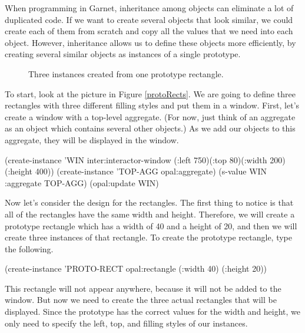 When programming in Garnet, inheritance among objects can eliminate a
lot of duplicated code.  If we want to create several objects that
look similar, we could create each of them from scratch and copy all
the values that we need into each object.  However, inheritance allows
us to define these objects more efficiently, by creating several
similar objects as instances of a single prototype.

\begin{figure}
  \begin{center}
\begin{makeimage}
\end{makeimage}
\begin{latexonly}
\end{latexonly}
  \end{center}
\caption{Three instances created from one prototype rectangle.}
\end{figure}

To start, look at the picture in Figure \ref{protoRects}.  We are
going to define three rectangles with three different filling styles
and put them in a window.  First, let's create a window with a
top-level aggregate.  (For now, just think of an aggregate as an
object which contains several other objects.)  As we add our objects
to this aggregate, they will be displayed in the window.

\begin{programexample}
(create-instance 'WIN inter:interactor-window
   (:left 750)(:top 80)(:width 200)(:height 400))
(create-instance 'TOP-AGG opal:aggregate)
(s-value WIN :aggregate TOP-AGG)
(opal:update WIN)
\end{programexample}

Now let's consider the design for the rectangles.  The first thing to
notice is that all of the rectangles have the same width and height.
Therefore, we will create a prototype rectangle which has a width of
40 and a height of 20, and then we will create three instances of that
rectangle.  To create the prototype rectangle, type the following.

\begin{programexample}
(create-instance 'PROTO-RECT opal:rectangle
   (:width 40) (:height 20))
\end{programexample}

This rectangle will not appear anywhere, because it will not be added
to the window.  But now we need to create the three actual rectangles
that will be displayed.  Since the prototype has the correct values
for the width and height, we only need to specify the left, top, and
filling styles of our instances.


